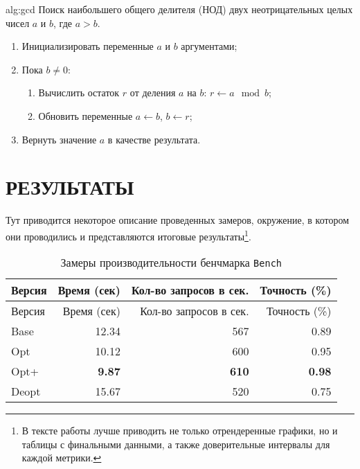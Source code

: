 \begin{algorithm}{alg:gcd} Поиск наибольшего общего делителя (НОД) двух
неотрицательных целых чисел \(a\) и \(b\), где \(a > b\).

\begin{enumerate}
\tightlist
\item
  Инициализировать переменные \(a\) и \(b\) аргументами;
\item
  Пока \(b \neq 0\):

  \begin{enumerate}
  \tightlist
  \item
    Вычислить остаток \(r\) от деления \(a\) на \(b\):
    \(r \gets a \mod b\);
  \item
    Обновить переменные \(a \gets b\), \(b \gets r\);
  \end{enumerate}
\item
  Вернуть значение \(a\) в качестве результата.
\end{enumerate}

\end{algorithm}

\clearpage
\pagebreak

\section{РЕЗУЛЬТАТЫ}\label{sec:results}

Тут приводится некоторое описание проведенных замеров, окружение, в
котором они проводились и представляются итоговые результаты\footnote{В
  тексте работы лучше приводить не только отрендеренные графики, но и
  таблицы с финальными данными, а также доверительные интервалы для
  каждой метрики.}.

\begin{longtable}[]{@{}lrrr@{}}
\caption{Замеры производительности бенчмарка
\passthrough{\lstinline!Bench!}}\tabularnewline
\toprule\noalign{}
Версия & Время (сек) & Кол-во запросов в сек. & Точность (\%) \\
\midrule\noalign{}
\endfirsthead
\toprule\noalign{}
Версия & Время (сек) & Кол-во запросов в сек. & Точность (\%) \\
\midrule\noalign{}
\endhead
\bottomrule\noalign{}
\endlastfoot
Base & 12.34 & 567 & 0.89 \\
Opt & 10.12 & 600 & 0.95 \\
Opt+ & \textbf{9.87} & \textbf{610} & \textbf{0.98} \\
Deopt & 15.67 & 520 & 0.75 \\
\end{longtable}

